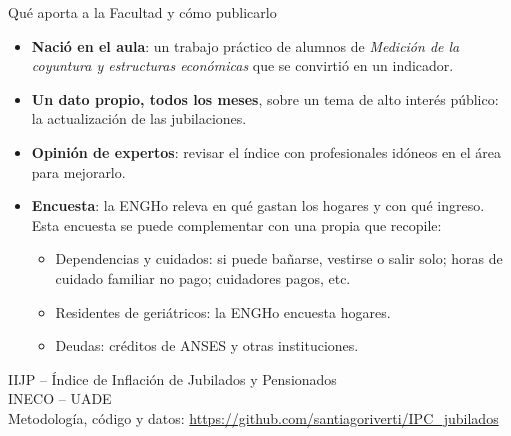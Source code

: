 \documentclass[aspectratio=169,11pt]{beamer}
\begin{document}
\begin{frame}{Qué aporta a la Facultad y cómo publicarlo}
  \begin{itemize}
    \setlength{\itemsep}{0.5em}
    \item \textbf{Nació en el aula}: un trabajo práctico de alumnos de \emph{Medición de la coyuntura y estructuras económicas} que se convirtió en un indicador.
    \item \textbf{Un dato propio, todos los meses}, sobre un tema de alto interés público: la actualización de las jubilaciones.
    \item \textbf{Opinión de expertos}: revisar el índice con profesionales idóneos en el área para mejorarlo.
    \item \textbf{Encuesta}: la ENGHo releva en qué gastan los hogares y con qué ingreso. Esta encuesta se puede complementar con una propia que recopile:
    \begin{itemize}
        \vspace{.2 cm}
        \item Dependencias y cuidados: si puede bañarse, vestirse o salir solo; horas de cuidado familiar no pago; cuidadores pagos, etc.
        \vspace{.2 cm}
        \item Residentes de geriátricos: la ENGHo encuesta hogares.
        \vspace{.2 cm}
        \item Deudas: créditos de ANSES y otras instituciones.
    \end{itemize}
  \end{itemize}
\end{frame}

\begin{frame}
  \begin{center}
    {\large IIJP -- Índice de Inflación de Jubilados y Pensionados}\\[0.5em]
    INECO -- UADE\\[2em]
    {\small Metodología, código y datos: \url{https://github.com/santiagoriverti/IPC_jubilados}}
  \end{center}
\end{frame}
\end{document}

